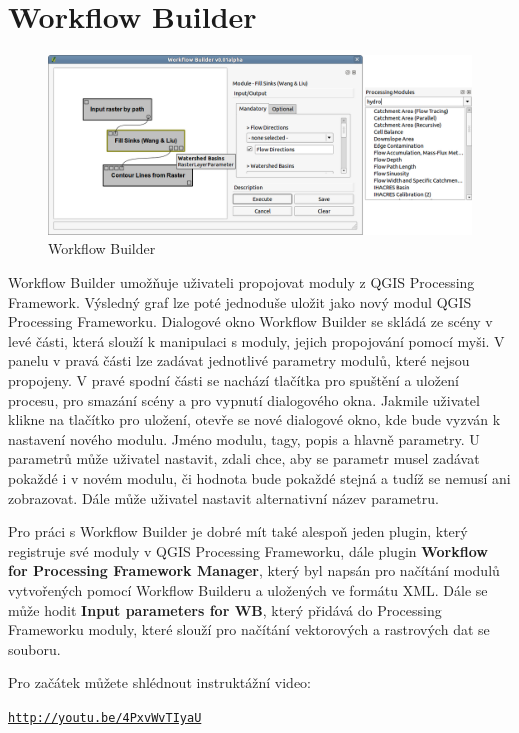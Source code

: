 \newpage
\chapter{Workflow Builder}

\begin{figure}[h]
	\centering
	\includegraphics[scale=0.38]{pictures/wf/wf_pm}
	\caption{Workflow Builder}
  	\label{wf}
\end{figure}

Workflow Builder umožňuje uživateli propojovat moduly z QGIS Processing Framework. Výsledný graf lze poté jednoduše uložit jako nový modul QGIS Processing Frameworku. Dialogové okno Workflow Builder se skládá ze scény v levé části, která slouží k manipulaci s moduly, jejich propojování pomocí myši. V panelu v pravá části lze zadávat jednotlivé parametry modulů, které nejsou propojeny. V pravé spodní části se nachází tlačítka pro spuštění a uložení procesu, pro smazání scény a pro vypnutí dialogového okna. Jakmile uživatel klikne na tlačítko pro uložení, otevře se nové dialogové okno, kde bude vyzván k nastavení nového modulu. Jméno modulu, tagy, popis a hlavně parametry. U parametrů může uživatel nastavit, zdali chce, aby se parametr musel zadávat pokaždé i v novém modulu, či hodnota bude pokaždé stejná a tudíž se nemusí ani zobrazovat. Dále může uživatel nastavit alternativní název parametru.

Pro práci s Workflow Builder je dobré mít také alespoň jeden plugin, který registruje své moduly v QGIS Processing Frameworku, dále plugin \textbf{Workflow for Processing Framework Manager}, který byl napsán pro načítání modulů vytvořených pomocí Workflow Builderu a uložených ve formátu XML. Dále se může hodit \textbf{Input parameters for WB}, který přidává do Processing Frameworku moduly, které slouží pro načítání vektorových a rastrových dat se souboru.

\noindent Pro začátek můžete shlédnout instruktážní video: 
\begin{center}
	\href{http://youtu.be/4PxvWvTIyaU}{\texttt{http://youtu.be/4PxvWvTIyaU}}
\end{center}


